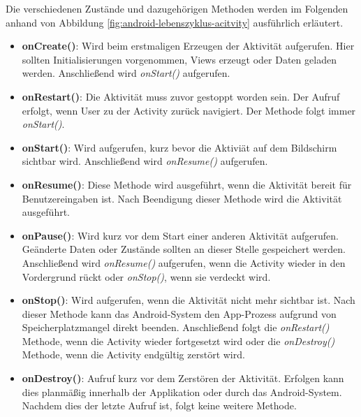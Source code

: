 \clearpage
Die verschiedenen Zustände und dazugehörigen Methoden werden im Folgenden anhand von Abbildung \ref{fig:android-lebenszyklus-acitvity} ausführlich erläutert. 

\begin{itemize}
\item\textbf{onCreate()}: Wird beim erstmaligen Erzeugen der Aktivität aufgerufen. Hier sollten Initialisierungen vorgenommen, Views erzeugt oder Daten geladen werden. Anschließend wird \textit{onStart()} aufgerufen.

\item\textbf{onRestart()}: Die Aktivität muss zuvor gestoppt worden sein. Der Aufruf erfolgt, wenn User zu der Activity zurück navigiert. Der Methode folgt immer \textit{onStart()}.

\item\textbf{onStart()}: Wird aufgerufen, kurz bevor die Aktiviät auf dem Bildschirm sichtbar wird. Anschließend wird \textit{onResume()} aufgerufen. 

\item\textbf{onResume()}: Diese Methode wird ausgeführt, wenn die Aktivität bereit für Benutzereingaben ist. Nach Beendigung dieser Methode wird die Aktivität ausgeführt.

\item\textbf{onPause()}: Wird kurz vor dem Start einer anderen Aktivität aufgerufen. Geänderte Daten oder Zustände sollten an dieser Stelle gespeichert werden. Anschließend wird \textit{onResume()} aufgerufen, wenn die Activity wieder in den Vordergrund rückt oder \textit{onStop()}, wenn sie verdeckt wird. 

\item\textbf{onStop()}: Wird aufgerufen, wenn die Aktivität nicht mehr sichtbar ist. Nach dieser Methode kann das Android-System den App-Prozess aufgrund von Speicherplatzmangel direkt beenden. Anschließend folgt die \textit{onRestart()} Methode, wenn die Activity wieder fortgesetzt wird oder die \textit{onDestroy()} Methode, wenn die Activity endgültig zerstört wird.

\item\textbf{onDestroy()}: Aufruf kurz vor dem Zerstören der Aktivität. Erfolgen kann dies planmäßig innerhalb der Applikation oder durch das Android-System. Nachdem dies der letzte Aufruf ist, folgt keine weitere Methode.

\end{itemize}


